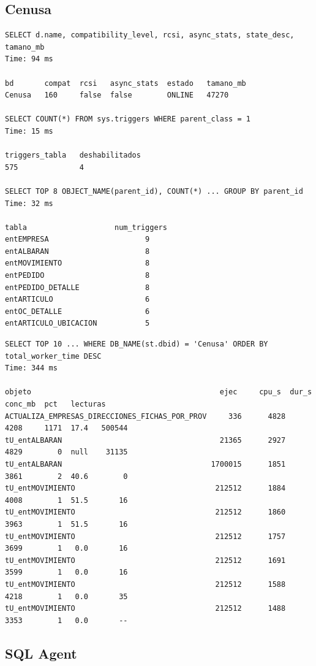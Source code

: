 \documentclass[11pt,a4paper]{article}
\begin{document}
\subsection{Cenusa}

\begin{lstlisting}[style=salida]
SELECT d.name, compatibility_level, rcsi, async_stats, state_desc, tamano_mb
Time: 94 ms

bd       compat  rcsi   async_stats  estado   tamano_mb
Cenusa   160     false  false        ONLINE   47270

SELECT COUNT(*) FROM sys.triggers WHERE parent_class = 1
Time: 15 ms

triggers_tabla   deshabilitados
575              4

SELECT TOP 8 OBJECT_NAME(parent_id), COUNT(*) ... GROUP BY parent_id
Time: 32 ms

tabla                    num_triggers
entEMPRESA                      9
entALBARAN                      8
entMOVIMIENTO                   8
entPEDIDO                       8
entPEDIDO_DETALLE               8
entARTICULO                     6
entOC_DETALLE                   6
entARTICULO_UBICACION           5
\end{lstlisting}

\begin{lstlisting}[style=salida]
SELECT TOP 10 ... WHERE DB_NAME(st.dbid) = 'Cenusa' ORDER BY total_worker_time DESC
Time: 344 ms

objeto                                           ejec     cpu_s  dur_s  conc_mb  pct   lecturas
ACTUALIZA_EMPRESAS_DIRECCIONES_FICHAS_POR_PROV     336      4828   4208     1171  17.4   500544
tU_entALBARAN                                    21365      2927   4829        0  null    31135
tU_entALBARAN                                  1700015      1851   3861        2  40.6        0
tU_entMOVIMIENTO                                212512      1884   4008        1  51.5       16
tU_entMOVIMIENTO                                212512      1860   3963        1  51.5       16
tU_entMOVIMIENTO                                212512      1757   3699        1   0.0       16
tU_entMOVIMIENTO                                212512      1691   3599        1   0.0       16
tU_entMOVIMIENTO                                212512      1588   4218        1   0.0       35
tU_entMOVIMIENTO                                212512      1488   3353        1   0.0       --
\end{lstlisting}

\subsection{SQL Agent}
\end{document}
